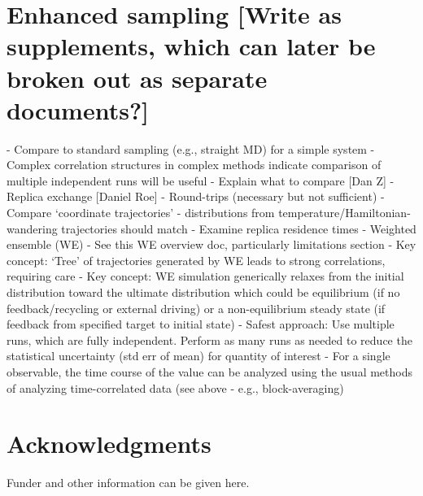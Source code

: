 \documentclass[9pt]{livecoms}
\begin{document}
\section{Enhanced sampling [Write as supplements, which can later be broken out as separate documents?]}
- Compare to standard sampling (e.g., straight MD) for a simple system
- Complex correlation structures in complex methods indicate comparison of multiple independent runs will be useful
    - Explain what to compare [Dan Z]
- Replica exchange [Daniel Roe]
    - Round-trips (necessary but not sufficient)
    - Compare ‘coordinate trajectories’ - distributions from temperature/Hamiltonian-wandering trajectories should match
    - Examine replica residence times
- Weighted ensemble (WE)
    - See this WE overview doc, particularly limitations section
    - Key concept: ‘Tree’ of trajectories generated by WE leads to strong correlations, requiring care
    - Key concept: WE simulation generically relaxes from the initial distribution toward the ultimate distribution which could be equilibrium (if no feedback/recycling or external driving) or a non-equilibrium steady state (if feedback from specified target to initial state)
    - Safest approach: Use multiple runs, which are fully independent.  Perform as many runs as needed to reduce the statistical uncertainty (std err of mean) for quantity of interest
    - For a single observable, the time course of the value can be analyzed using the usual methods of analyzing time-correlated data (see above - e.g., block-averaging)




\section{Acknowledgments}

Funder and other information can be given here.



\end{document}
